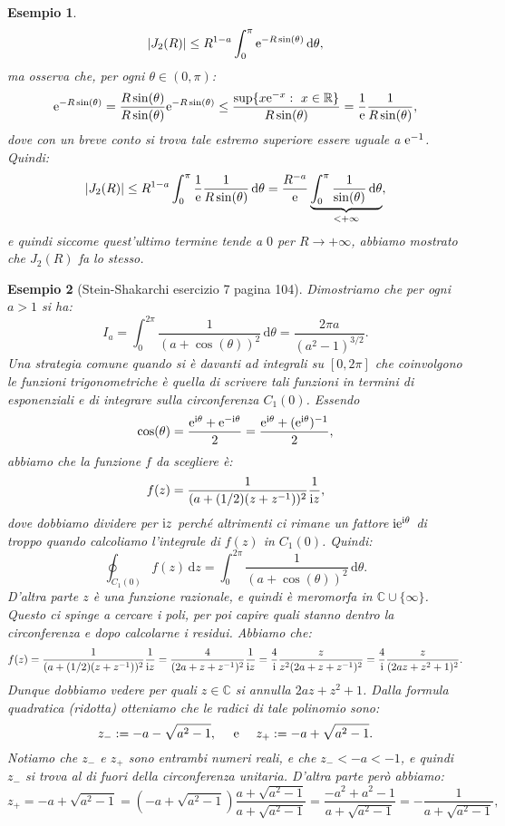 \documentclass[11pt]{book}
\theoremstyle{Definizione}
\theoremstyle{TeoremaProposizioneLemmaCorollarioCongettura}
\theoremstyle{OsservazioneNotaEsempio}
\newtheorem{myes}{Esempio}[section]
\newcommand{\R}{\mathbb{R}}
\newcommand{\C}{\mathbb{C}}
\renewcommand{\i}{\textup{i}}
\newcommand{\e}{\textup{e}}
\renewcommand{\d}{\mathrm{d}}
\newcommand{\dz}{\,\d z}
\newcommand{\dtheta}{\, \d \theta}
\begin{document}
\begin{myes}
$$
|J_2(R)| \leq R^{1-a}\int_{0}^{\pi}  \e^{-R \sin(\theta)} \dtheta,
$$
ma osserva che, per ogni $\theta \in (0,\pi)$:
$$
\e^{-R \sin(\theta)} = \frac{R\sin(\theta)}{R\sin(\theta)} \e^{-R \sin(\theta)} \leq \frac{\sup\{x \e^{-x}:\ x\in \R\}}{R \sin(\theta)} = \frac{1}{\e}\frac{1}{R \sin(\theta)},
$$
dove con un breve conto si trova tale estremo superiore essere uguale a $\e^{-1}$. Quindi:
$$
|J_2(R)| \leq R^{1-a}\int_{0}^{\pi} \frac{1}{\e}\frac{1}{R \sin(\theta)}\dtheta = \frac{R^{-a}}{\e}\underbrace{\int_{0}^{\pi} \frac{1}{\sin(\theta)}\dtheta}_{<+\infty},
$$
e quindi siccome quest'ultimo termine tende a $0$ per $R \to +\infty$, abbiamo mostrato che $J_2(R)$ fa lo stesso.
\end{myes}
\begin{myes}[Stein-Shakarchi esercizio 7 pagina 104]\label{es:SteinShakarchiEs7pag104}
Dimostriamo che per ogni $a > 1$ si ha:
$$
I_a = \int_0^{2\pi} \frac{1}{(a+\cos(\theta))^2}\dtheta = \frac{2\pi a}{(a^2-1)^{3/2}}.
$$
Una strategia comune quando si è davanti ad integrali su $[0,2\pi]$ che coinvolgono le funzioni trigonometriche è quella di scrivere tali funzioni in termini di esponenziali e di integrare sulla circonferenza $C_1(0)$. Essendo
$$
\cos(\theta) = \frac{\e^{\i\theta}+\e^{-\i\theta}}{2} = \frac{\e^{\i\theta}+ (\e^{\i\theta})^{-1}}{2},
$$
abbiamo che la funzione $f$ da scegliere è:
$$
f(z) = \frac{1}{(a+(1/2)(z+z^{-1}))^2}\frac{1}{\i z},
$$
dove dobbiamo dividere per $\i z$ perché altrimenti ci rimane un fattore $\i \e^{\i\theta}$ di troppo quando calcoliamo l'integrale di $f(z)$ in $C_1(0)$. Quindi:
$$
\oint_{C_1(0)} f(z)\dz = \int_{0}^{2\pi} \frac{1}{(a+\cos(\theta))^2}\dtheta.
$$
D'altra parte $z$ è una funzione razionale, e quindi è meromorfa in $\C \cup \{\infty\}$. Questo ci spinge a cercare i poli, per poi capire quali stanno dentro la circonferenza e dopo calcolarne i residui. Abbiamo che:
$$
f(z) = \frac{1}{(a+(1/2)(z+z^{-1}))^2}\frac{1}{\i z} = \frac{4}{(2a+z+z^{-1})^2}\frac{1}{\i z} = \frac{4}{\i}\frac{z}{z^2(2a+z+z^{-1})^2} = \frac{4}{\i}\frac{z}{(2az+z^2+1)^2}.
$$
Dunque dobbiamo vedere per quali $z\in \C$ si annulla $2az+z^2+1$. Dalla formula quadratica (ridotta) otteniamo che le radici di tale polinomio sono:
$$
z_- := -a-\sqrt{a^2-1},\quad \textup{ e }\quad z_+ := -a+\sqrt{a^2-1}.
$$
Notiamo che $z_-$ e $z_+$ sono entrambi numeri reali, e che $z_- < -a < -1$, e quindi $z_-$ si trova al di fuori della circonferenza unitaria. D'altra parte però abbiamo:
$$
z_+ = -a +\sqrt{a^2-1} = (-a+\sqrt{a^2-1})\frac{a+\sqrt{a^2-1}}{a+\sqrt{a^2-1}} = \frac{-a^2+a^2-1}{a+\sqrt{a^2-1}} = -\frac{1}{a+\sqrt{a^2-1}},
$$
\end{myes}
\end{document}
